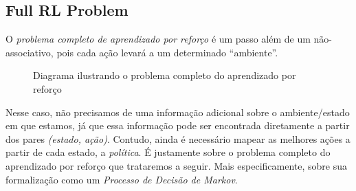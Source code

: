 \documentclass{article}
\begin{document}
        \subsection{Full RL Problem}
        
            O \emph{problema completo de aprendizado por reforço} é um passo além de um não-associativo, pois cada ação levará a um determinado ``ambiente''. 
        
            \begin{figure}[ht]
                \centering
                \fullrldiagram
                \caption{Diagrama ilustrando o problema completo do aprendizado por reforço}
                \label{fig:full-rl-problem}
            \end{figure}
            
            Nesse caso, não precisamos de uma informação adicional sobre o ambiente/estado em que estamos, já que essa informação pode ser encontrada diretamente a partir dos pares \emph{(estado, ação)}. Contudo, ainda é necessário mapear as melhores ações a partir de cada estado, a \emph{política}. É justamente sobre o problema completo do aprendizado por reforço que trataremos a seguir. Mais especificamente, sobre sua formalização como um \emph{Processo de Decisão de Markov}.
\end{document}
